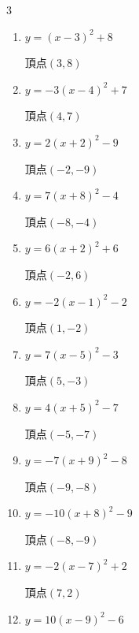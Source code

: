 \begin{multicols}{3}
\begin{enumerate}
        $\displaystyle 頂点\left( 6 , -2 \right)$

  \item $\displaystyle y=\left( x-3\right)^{2}+8$

        $\displaystyle 頂点\left( 3 , 8 \right)$

  \item $\displaystyle y=-3\left( x-4\right)^{2}+7$

        $\displaystyle 頂点\left( 4 , 7 \right)$

  \item $\displaystyle y=2\left( x+2\right)^{2}-9$

        $\displaystyle 頂点\left( -2 , -9 \right)$

  \item $\displaystyle y=7\left( x+8\right)^{2}-4$

        $\displaystyle 頂点\left( -8 , -4 \right)$

  \item $\displaystyle y=6\left( x+2\right)^{2}+6$

        $\displaystyle 頂点\left( -2 , 6 \right)$

  \item $\displaystyle y=-2\left( x-1\right)^{2}-2$

        $\displaystyle 頂点\left( 1 , -2 \right)$

  \item $\displaystyle y=7\left( x-5\right)^{2}-3$

        $\displaystyle 頂点\left( 5 , -3 \right)$

  \item $\displaystyle y=4\left( x+5\right)^{2}-7$

        $\displaystyle 頂点\left( -5 , -7 \right)$

  \item $\displaystyle y=-7\left( x+9\right)^{2}-8$

        $\displaystyle 頂点\left( -9 , -8 \right)$

  \item $\displaystyle y=-10\left( x+8\right)^{2}-9$

        $\displaystyle 頂点\left( -8 , -9 \right)$

  \item $\displaystyle y=-2\left( x-7\right)^{2}+2$

        $\displaystyle 頂点\left( 7 , 2 \right)$

  \item $\displaystyle y=10\left( x-9\right)^{2}-6$


\end{enumerate}
\end{multicols}
